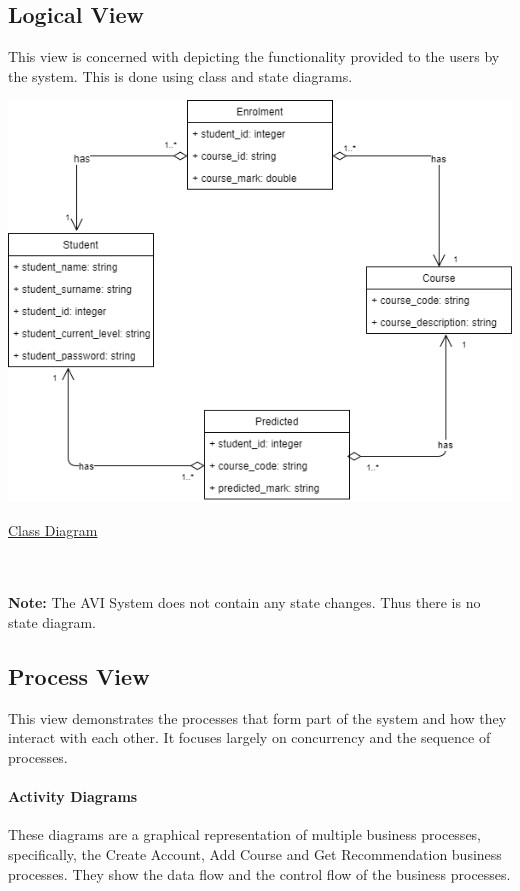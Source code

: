 \documentclass[10pt]{article}
\begin{document}
\subsection{Logical View}

This view is concerned with depicting the functionality provided to the users by the system. This is done using class and state diagrams.
\begin{center}
\includegraphics[width=.9\textwidth]{class_diagram.png}
\end{center}
\caption{\underline{Class Diagram}} \\ \\

\textbf{Note:} The AVI System does not contain any state changes. Thus there is no state diagram. 

\subsection{Process View}

This view demonstrates the processes that form part of the system and how they interact with each other. It focuses largely on concurrency and the sequence of processes.


\paragraph{Activity Diagrams \\}
These diagrams are a graphical representation of multiple business processes, specifically, the Create Account, Add Course and Get Recommendation business processes. They show the data flow and the control flow of the business processes.
\end{document}
